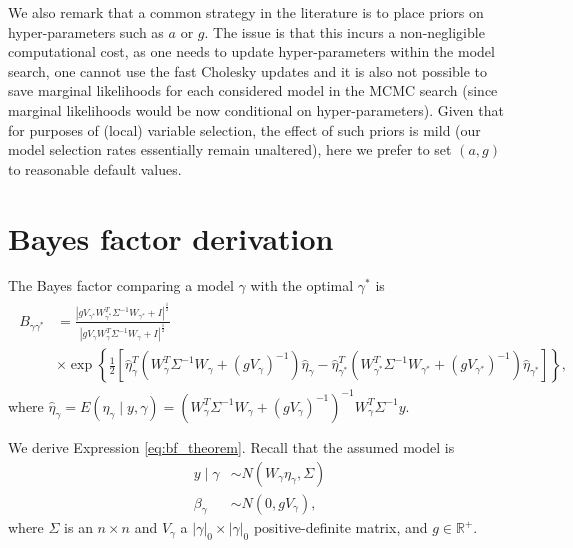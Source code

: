 We also remark that a common strategy in the literature is to place priors on hyper-parameters such as $a$ or $g$. The issue is that this incurs a non-negligible computational cost, as one needs to update hyper-parameters within the model search, one cannot use the fast Cholesky updates and it is also not possible to save marginal likelihoods for each considered model in the MCMC search (since marginal likelihoods would be now conditional on hyper-parameters). Given that for purposes of (local) variable selection, the effect of such priors is mild (our model selection rates essentially remain unaltered), here we prefer to set $(a,g)$ to reasonable default values. 





\section{Bayes factor derivation}
\label{supplsec:bf_derivation}

The Bayes factor comparing a model $\gamma$ with the optimal $\gamma^*$ is
\begin{align}
	\begin{split}
 B_{\gamma \gamma^*}&=
\frac{\left|g V_{\gamma^*} W_{\gamma^*}^T \Sigma^{-1} W_{\gamma^*}  + I \right|^{\frac{1}{2}}}{\left| g V_{\gamma} W_{\gamma}^T \Sigma^{-1} W_\gamma  + I \right|^{\frac{1}{2}}} \label{eq:bf_theorem}
\\
&\times \exp \left\{  \frac{1}{2} \left[ \hat{\eta}_\gamma^T ( W_\gamma^T \Sigma^{-1} W_\gamma + (g V_\gamma)^{-1}) \hat{\eta}_\gamma 
- \hat{\eta}_{\gamma^*}^T ( W_{\gamma^*}^T \Sigma^{-1} W_{\gamma^*} + (g V_{\gamma^*})^{-1}) \hat{\eta}_{\gamma^*}
\right] \right\},
\end{split}
\end{align}
where $\hat{\eta}_\gamma= E(\eta_\gamma \mid y,\gamma)= (W_\gamma^T \Sigma^{-1} W_\gamma + (g V_\gamma)^{-1})^{-1} W_\gamma^T \Sigma^{-1} y$. 


We derive Expression \eqref{eq:bf_theorem}. %
Recall that the assumed model is
\begin{align}
 y \mid \gamma &\sim N(W_\gamma \eta_\gamma, \Sigma)
\nonumber \\
 \beta_\gamma &\sim N(0, g V_\gamma),
\nonumber
\end{align}
where $\Sigma$ is an $n \times n$ and $V_\gamma$ a $|\gamma|_0 \times |\gamma|_0$ positive-definite matrix, and $g \in \mathbb{R}^+$.

